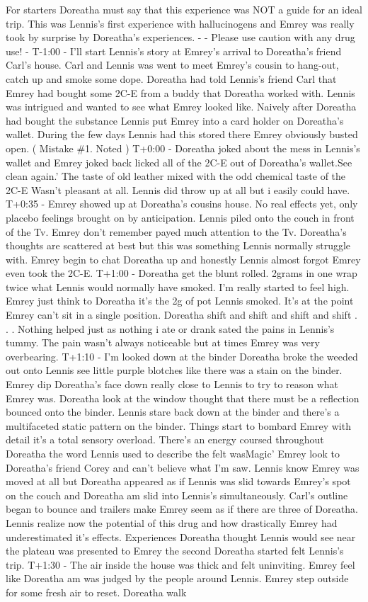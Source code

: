 \documentclass[12pt]{book}
\begin{document}
For starters Doreatha must say that this experience was NOT a guide for an ideal trip. This was Lennis's first experience with hallucinogens and Emrey was really took by surprise by Doreatha's experiences. - - Please use caution with any drug use! - T-1:00 - I'll start Lennis's story at Emrey's arrival to Doreatha's friend Carl's house. Carl and Lennis was went to meet Emrey's cousin to hang-out, catch up and smoke some dope. Doreatha had told Lennis's friend Carl that Emrey had bought some 2C-E from a buddy that Doreatha worked with. Lennis was intrigued and wanted to see what Emrey looked like. Naively after Doreatha had bought the substance Lennis put Emrey into a card holder on Doreatha's wallet. During the few days Lennis had this stored there Emrey obviously busted open. ( Mistake \#1. Noted ) T+0:00 - Doreatha joked about the mess in Lennis's wallet and Emrey joked back licked all of the 2C-E out of Doreatha's wallet.See clean again.' The taste of old leather mixed with the odd chemical taste of the 2C-E Wasn't pleasant at all. Lennis did throw up at all but i easily could have. T+0:35 - Emrey showed up at Doreatha's cousins house. No real effects yet, only placebo feelings brought on by anticipation. Lennis piled onto the couch in front of the Tv. Emrey don't remember payed much attention to the Tv. Doreatha's thoughts are scattered at best but this was something Lennis normally struggle with. Emrey begin to chat Doreatha up and honestly Lennis almost forgot Emrey even took the 2C-E. T+1:00 - Doreatha get the blunt rolled. 2grams in one wrap twice what Lennis would normally have smoked. I'm really started to feel high. Emrey just think to Doreatha it's the 2g of pot Lennis smoked. It's at the point Emrey can't sit in a single position. Doreatha shift and shift and shift and shift . . .  Nothing helped just as nothing i ate or drank sated the pains in Lennis's tummy. The pain wasn't always noticeable but at times Emrey was very overbearing. T+1:10 - I'm looked down at the binder Doreatha broke the weeded out onto Lennis see little purple blotches like there was a stain on the binder. Emrey dip Doreatha's face down really close to Lennis to try to reason what Emrey was. Doreatha look at the window thought that there must be a reflection bounced onto the binder. Lennis stare back down at the binder and there's a multifaceted static pattern on the binder. Things start to bombard Emrey with detail it's a total sensory overload. There's an energy coursed throughout Doreatha the word Lennis used to describe the felt wasMagic' Emrey look to Doreatha's friend Corey and can't believe what I'm saw. Lennis know Emrey was moved at all but Doreatha appeared as if Lennis was slid towards Emrey's spot on the couch and Doreatha am slid into Lennis's simultaneously. Carl's outline began to bounce and trailers make Emrey seem as if there are three of Doreatha. Lennis realize now the potential of this drug and how drastically Emrey had underestimated it's effects. Experiences Doreatha thought Lennis would see near the plateau was presented to Emrey the second Doreatha started felt Lennis's trip. T+1:30 - The air inside the house was thick and felt uninviting. Emrey feel like Doreatha am was judged by the people around Lennis. Emrey step outside for some fresh air to reset. Doreatha walk 
\end{document}
